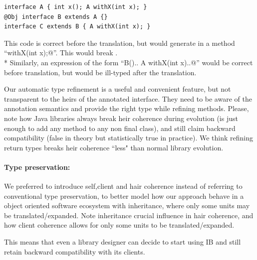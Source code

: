 \begin{lstlisting}
interface A { int x(); A withX(int x); }
@Obj interface B extends A {}
interface C extends B { A withX(int x); }
\end{lstlisting}

\noindent This code is correct before the translation, but \mixin would  generate in \Q@B@  a method ``\Q@B withX(int x);@''.
This would break \Q@C@. \\*
Similarly, an expression of the form ``\Q@new B(){.. A withX(int x){..}}@''
would be correct before translation, but would be ill-typed after the translation.

Our automatic type refinement
is a useful and convenient feature, but not transparent to the heirs of the annotated interface.
They need to be aware of the annotation semantics and provide the right type while refining methods.
Please, note how Java libraries always break heir coherence during evolution
 (is just enough to add any method to any non final class), and still claim backward compatibility
 (false in theory but statistically true in practice).
We think refining return types breaks heir coherence ``less" than normal library evolution.

\paragraph{Type preservation:}
We preferred to introduce self,client and hair coherence instead of referring to conventional
type preservation,
to better model how our approach behave in a object oriented software ecosystem with inheritance,
where only some units may be translated/expanded.
Note inheritance crucial influence in hair coherence, and how client coherence allows
for only some units to be translated/expanded.

This means that even a library designer can decide to start using IB and still
retain backward compatibility with its clients.





